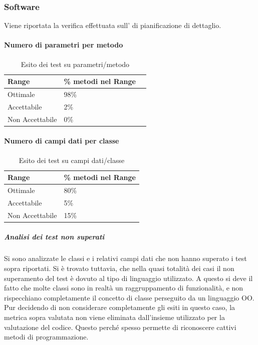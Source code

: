 \documentclass[12pt,a4paper]{article}
\begin{document}
	\subsubsection{Software}
	Viene riportata la verifica effettuata sull'  di pianificazione di dettaglio. 
	\paragraph{Numero di parametri per metodo}
	\begin{table}[H]
		\begin{center}
			\begin{tabular}{p{} p{0.3\textwidth} p{}}
				\toprule
				\textbf{Range}   & \textbf{\% metodi nel Range}	 \\ \midrule
				\midrule
				Ottimale & 98\% \\ \midrule
				Accettabile & 2\%  \\ \midrule
				Non Accettabile  & 0\%  \\ \midrule
				\bottomrule
			\end{tabular}
		\end{center}
		\caption{Esito dei test su  parametri/metodo}
	\end{table}
	
	\paragraph{Numero di campi dati per classe}
	\begin{table}[H]
		\begin{center}
			\begin{tabular}{p{} p{} }
				\toprule
				\textbf{Range}   & \textbf{\% metodi nel Range}	\\ \midrule
				\midrule
				Ottimale & 80\% \\ \midrule
				Accettabile & 5\%  \\ \midrule
				Non Accettabile  & 15\%  \\ \midrule
				\bottomrule
			\end{tabular}
		\end{center}
		\caption{Esito dei test su campi dati/classe}
	\end{table}
	
	\subparagraph{Analisi dei test non superati} 
	Si sono analizzate le classi e i relativi campi dati che non hanno superato i test sopra riportati. Si è trovato tuttavia, che nella quasi totalità dei casi il non superamento del test è dovuto al tipo di linguaggio utilizzato. A questo si deve il fatto che molte classi sono in realtà un raggruppamento di funzionalità, e non rispecchiano completamente il concetto di classe perseguito da un linguaggio OO. Pur decidendo di non considerare completamente gli esiti in questo caso, la metrica sopra valutata non viene eliminata dall'insieme utilizzato per la valutazione del codice. 
	Questo perché spesso permette di riconoscere cattivi metodi di programmazione.
	
\end{document}

